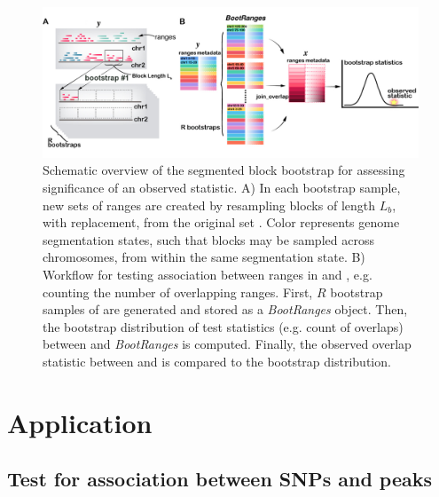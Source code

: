 \begin{figure}[t]
\centering
\setlength{\abovecaptionskip}{-0.05cm}
\includegraphics[scale=0.16]{Figures/bootRanges.jpeg}
\caption{
  Schematic overview of the segmented block bootstrap 
  for assessing significance of an observed statistic.
  A) In each bootstrap sample, 
  new sets of ranges are created by resampling blocks of length 
  $L_b$, with replacement, from the original set . 
  Color represents genome segmentation states, such that blocks 
  may be sampled across chromosomes, from within the same 
  segmentation state.
  B) Workflow for testing association between 
  ranges in  and ,  
  e.g. counting the number of overlapping ranges. 
  First, $R$ bootstrap samples of  are 
  generated and stored as a \textit{BootRanges} object.
  Then, the bootstrap distribution of test statistics 
  (e.g. count of overlaps) 
  between  and \textit{BootRanges} is computed.
  Finally, the observed overlap statistic between  and  
  is compared to the bootstrap distribution.}
\label{fig:framework}
\end{figure}


\section{Application}
\subsection{Test for association between SNPs and peaks}

